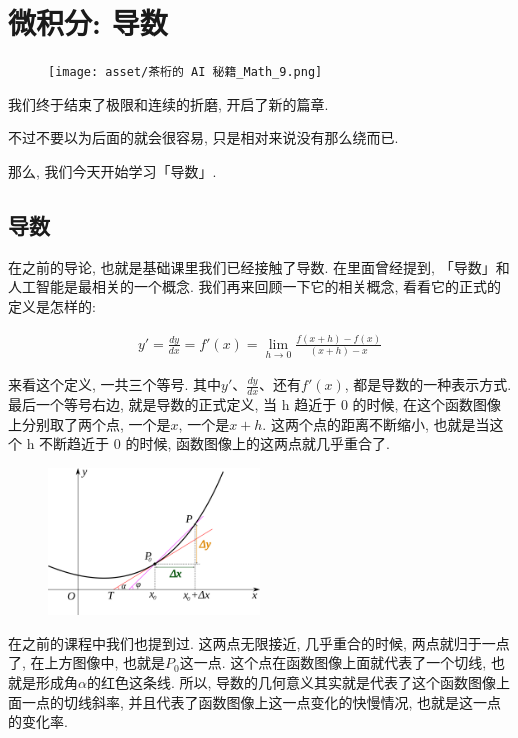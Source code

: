 \chapter{微积分: 导数}

\begin{figure}[ht]
  \centering
  \texttt{[image: asset/茶桁的 AI 秘籍\_Math\_9.png]}
\end{figure}

\newpage

我们终于结束了极限和连续的折磨, 开启了新的篇章. 

不过不要以为后面的就会很容易, 只是相对来说没有那么绕而已. 

那么, 我们今天开始学习「导数」. 

\section{导数}

在之前的导论, 也就是基础课里我们已经接触了导数. 在里面曾经提到, 「导数」和人工智能是最相关的一个概念. 我们再来回顾一下它的相关概念, 看看它的正式的定义是怎样的: 

\begin{align*}
  y' = \frac{dy}{dx} = f'(x) = \lim_{h \to 0} \frac{f(x+h) - f(x)}{(x+h) - x}
\end{align*}

来看这个定义, 一共三个等号. 其中$y'$、$\frac{dy}{dx}$、还有$f'(x)$, 都是导数的一种表示方式. 最后一个等号右边, 就是导数的正式定义, 当 h 趋近于 0 的时候, 在这个函数图像上分别取了两个点, 一个是$x$, 一个是$x+h$. 这两个点的距离不断缩小, 也就是当这个 h 不断趋近于 0 的时候, 函数图像上的这两点就几乎重合了. 

\begin{figure}[ht]
  \centering
  \includegraphics[width=0.5\textwidth]{asset/d46aa419-f50b-4bfd-83eb-d807f3c821a0.png}
  \caption{}
  \label{fig:img10_1}
\end{figure}

在之前的课程中我们也提到过. 这两点无限接近, 几乎重合的时候, 两点就归于一点了, 在上方图像中, 也就是$P_0$这一点. 这个点在函数图像上面就代表了一个切线, 也就是形成角$\alpha$的红色这条线. 所以, 导数的几何意义其实就是代表了这个函数图像上面一点的切线斜率, 并且代表了函数图像上这一点变化的快慢情况, 也就是这一点的变化率. 

